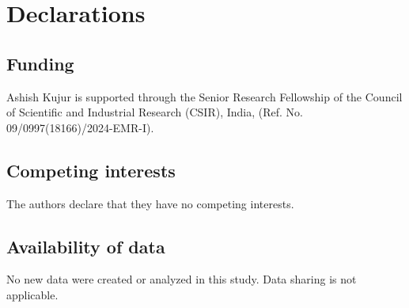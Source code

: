 \documentclass[10pt,oneside,reqno]{amsart}
\theoremstyle{definition}
\theoremstyle{remark}
\numberwithin{equation}{section}
\begin{document}
\section*{Declarations}
\subsection*{Funding} Ashish Kujur is supported through the Senior Research Fellowship of the Council of Scientific and Industrial Research (CSIR), India, (Ref. No. 09/0997(18166)/2024-EMR-I).

\subsection*{Competing interests} The authors declare that they have no competing interests.
\subsection*{Availability of data} No new data were created or analyzed in this study. Data sharing is not applicable.


\nocite{*}

\end{document}
